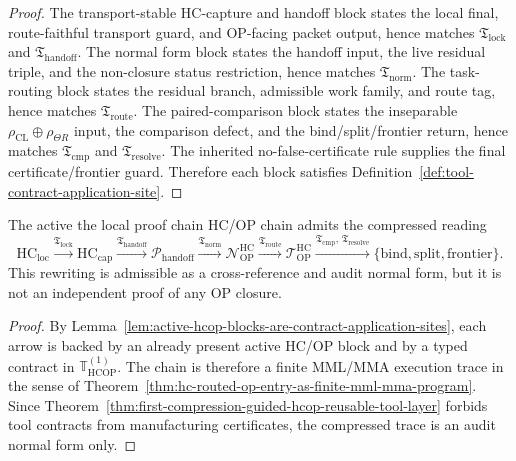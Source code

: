 \begin{proof}
The transport-stable HC-capture and handoff block states the local final, route-faithful transport guard, and OP-facing packet output, hence matches \(\mathfrak T_{\mathrm{lock}}\) and \(\mathfrak T_{\mathrm{handoff}}\). The normal form block states the handoff input, the live residual triple, and the non-closure status restriction, hence matches \(\mathfrak T_{\mathrm{norm}}\). The task-routing block states the residual branch, admissible work family, and route tag, hence matches \(\mathfrak T_{\mathrm{route}}\). The paired-comparison block states the inseparable \(\rho_{\mathrm{CL}}\oplus\rho_{\Theta R}\) input, the comparison defect, and the bind/split/frontier return, hence matches \(\mathfrak T_{\mathrm{cmp}}\) and \(\mathfrak T_{\mathrm{resolve}}\). The inherited no-false-certificate rule supplies the final certificate/frontier guard. Therefore each block satisfies Definition~\ref{def:tool-contract-application-site}.
\end{proof}

\begin{proposition}
\label{prop:tool-indexed-rewriting-active-hcop-chain}
The active the local proof chain HC/OP chain admits the compressed reading
\[
 \mathrm{HC}_{\mathrm{loc}}
 \xrightarrow{\mathfrak T_{\mathrm{lock}}}
 \mathrm{HC}_{\mathrm{cap}}
 \xrightarrow{\mathfrak T_{\mathrm{handoff}}}
 \mathcal P_{\mathrm{handoff}}
 \xrightarrow{\mathfrak T_{\mathrm{norm}}}
 \mathcal N_{\mathrm{OP}}^{\mathrm{HC}}
 \xrightarrow{\mathfrak T_{\mathrm{route}}}
 \mathcal T_{\mathrm{OP}}^{\mathrm{HC}}
 \xrightarrow{\mathfrak T_{\mathrm{cmp}},\,\mathfrak T_{\mathrm{resolve}}}
 \{\mathrm{bind},\mathrm{split},\mathrm{frontier}\}.
\]
This rewriting is admissible as a cross-reference and audit normal form, but it is not an independent proof of any OP closure.
\end{proposition}

\begin{proof}
By Lemma~\ref{lem:active-hcop-blocks-are-contract-application-sites}, each arrow is backed by an already present active HC/OP block and by a typed contract in \(\mathbb T_{\mathrm{HCOP}}^{(1)}\). The chain is therefore a finite MML/MMA execution trace in the sense of Theorem~\ref{thm:hc-routed-op-entry-as-finite-mml-mma-program}. Since Theorem~\ref{thm:first-compression-guided-hcop-reusable-tool-layer} forbids tool contracts from manufacturing certificates, the compressed trace is an audit normal form only.
\end{proof}

